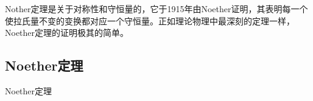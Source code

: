 
Nother定理是关于对称性和守恒量的，它于1915年由Noether证明，其表明每一个使拉氏量不变的变换都对应一个守恒量。正如理论物理中最深刻的定理一样，Noether定理的证明极其的简单。

\subsection{Noether定理}
\begin{theorem}{Noether定理}

\end{theorem}
